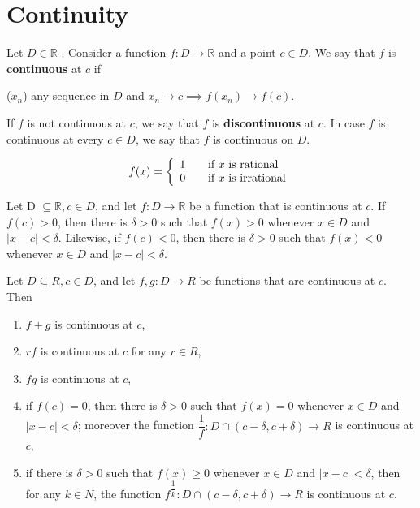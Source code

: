 \documentclass[a4paper,oneside]{book}
\begin{document}
\chapter{Continuity}
\begin{definition}[Continuity]
\label{Continuity}
Let $D \in \mathbb{R}$ . Consider a function $f : D \rightarrow
\mathbb{R}$ and a point $c \in D$. We say that $f$ is \textbf{continuous} at
$c$ if 
\begin{center}
($x_n$) any
sequence in $D$ and $x_n \rightarrow c \implies f(x_n) \rightarrow f(c)$.
\end{center}
If $f$ is not continuous at $c$, we say that $f$ is \textbf{discontinuous} at
$c$. In case $f$ is continuous at every $c \in D$, we say that $f$ is continuous
on $D.$
\end{definition}
\begin{definition}
$$ f(x) = \left\{ 
  \begin{array}{l l}
    1 & \quad \text{if $x$ is rational}\\
    0 & \quad \text{if $x$ is irrational}
  \end{array} \right.$$
  \label{Dirichlet Function}
\end{definition}
\begin{lemma}
Let D $\subseteq \mathbb{R}, c \in D$, and let $f : D \rightarrow \mathbb{R}$ be a function that is
continuous at $c$. If $f(c) > 0$, then there is $\delta > 0$ such that $f(x) > 0$ whenever
$x \in D$ and $\left|x - c\right| < \delta$. Likewise, if $f(c) < 0$, then there is $\delta > 0$ such that
$f(x) < 0$ whenever $x \in D$ and $\left|x - c\right| < \delta$.
\end{lemma}
\begin{proposition}
Let $D \subseteq R, c \in D$, and let $f, g : D \to R$ be functions that
are continuous at $c$. Then
\begin{enumerate}
\item $f + g$ is continuous at $c$,
\item $rf$ is continuous at $c$ for any $r \in R$,
\item $fg$ is continuous at $c$,
\item if $ f(c) = 0$, then there is $ \delta > 0$ such that $f (x) = 0$ whenever $x \in D$ and $\left|x-c\right| < \delta$; moreover the function $ \dfrac{1}{f} : D \cap (c- \delta, c+ \delta) \to R$ is continuous
at $c$, 
\item if there is $ \delta > 0$ such that $f (x) \ge 0$ whenever $x \in D$ and $\left|x-c\right| < \delta $, then for any $k \in N$, the function $f^{\dfrac{1}{k}} : D \cap (c - \delta, c + \delta) \to R$ is continuous at $c$.
\end{enumerate}
\end{proposition}
\end{document}
